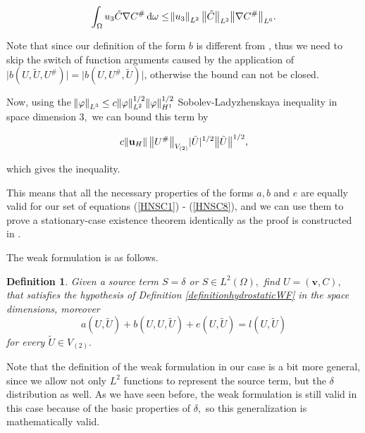 \documentclass[11pt]{article}
\newtheorem{definition}{Definition}
\newcommand*\diff{\mathop{}\!\mathrm{d}}
\begin{document}
\begin{itemize}
  \[  \int_\Omega u_3 \tilde{C} \nabla C^\# \diff \omega  \leq  \norm{u_3}_{L^2} \big \| \tilde{C} \big \| _{L^3} \big \| \nabla C^\# \big \| _{L^6}.\]
  
  Note that since our definition of the form $b$ is different from \cite{temam2005some}, thus we need to skip the switch of function arguments caused by the application of $ \lvert b(U, \tilde{U}, U^\#) \rvert = \lvert b(U, U^\#, \tilde{U}) \rvert$, otherwise the bound can not be closed.
  
  Now, using the $\norm{\varphi}_{L^3} \leq c \norm{\varphi}_{L^2}^{1/2} \norm{\varphi}_{H^1}^{1/2}$ Sobolev-Ladyzhenskaya inequality in space dimension $3,$ we can bound this term by
  
  \[ c \norm{\mathbf{u}_H} \big \| U^\# \big \| _{V_{(2)}} \lvert \tilde{U} \rvert ^ {1/2} \big \| \tilde{U} \big \| ^{1/2} ,\]
  
  which gives the inequality.

\end{itemize}

This means that all the necessary properties of the forms $a, b$ and $e$ are equally valid for our set of equations (\ref{HNSC1}) - (\ref{HNSC8}), and we can use them to prove a stationary-case existence theorem identically as the proof is constructed in \cite{temam2005some}. 

The weak formulation is as follows.



\begin{definition}
Given a source term $S = \delta$ or $S \in L^2(\Omega),$ find $U = (\mathbf{v}, C),$ that satisfies the hypothesis of Definition \ref{definitionhydrostaticWF} in the space dimensions, moreover
\begin{equation} \label{FWSTAT} a(U, \tilde{U}) + b(U,U, \tilde{U}) + e(U, \tilde{U}) = l(U, \tilde{U}) \end{equation}
for every $\tilde{U} \in V_{(2)}.$
\end{definition}

Note that the definition of the weak formulation in our case is a bit more general, since we allow not only $L^2$ functions to represent the source term, but the $\delta$ distribution as well. As we have seen before, the weak formulation is still valid in this case because of the basic properties of $\delta,$ so this generalization is mathematically valid. 
\end{document}
